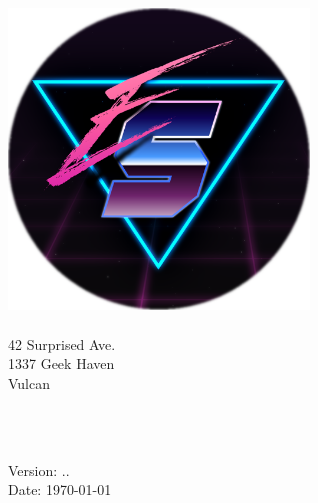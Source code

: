 \begin{titlepage}
	\vspace*{\fill}
	\begin{center}
		\vfill
		\includegraphics[width=8cm]{../LatexGlobal/images/CompanyLogo}\\
		\vspace{1cm}
		\Large{\companyName\\}
		\large{42 Surprised Ave.}\\
		\large{1337 Geek Haven}\\
		\large{Vulcan}\\
		\vspace{2cm}
		
		\Large{\doctype}\\
		\Huge{\doctitle}\\
		\vspace{2cm}
		
		\normalsize{Version: \majorversion.\minorversion.\buildversion}\\
		\vspace{\baselineskip}
		\normalsize{Date: \today}\\
	\end{center}
	\vspace*{\fill}
\end{titlepage}
\clearpage